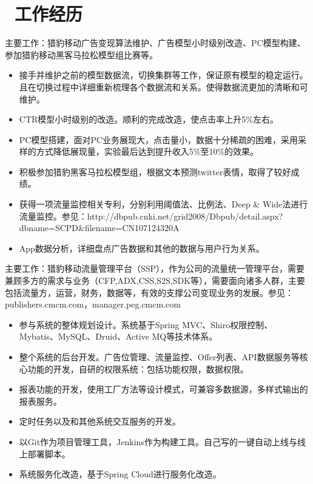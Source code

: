 \documentclass{resume}
\begin{document}



\section{\faUsers\ 工作经历}
\role{CTR、CVR预估}{广告算法}
\begin{onehalfspacing}
主要工作：猎豹移动广告变现算法维护、广告模型小时级别改造、PC模型构建、参加猎豹移动黑客马拉松模型组比赛等。
\begin{itemize}
  \item 接手并维护之前的模型数据流，切换集群等工作，保证原有模型的稳定运行。且在切换过程中详细重新梳理各个数据流和关系。使得数据流更加的清晰和可维护。 
  \item CTR模型小时级别的改造。顺利的完成改造，使点击率上升5\%左右。
  \item PC模型搭建，面对PC业务展现大，点击量小，数据十分稀疏的困难，采用采样的方式降低展现量，实验最后达到提升收入5\%至10\%的效果。
  \item 积极参加猎豹黑客马拉松模型组，根据文本预测twitter表情，取得了较好成绩。
  \item 获得一项流量监控相关专利，分别利用阈值法、比例法、Deep \& Wide法进行流量监控。参见：http://dbpub.cnki.net/grid2008/Dbpub/detail.aspx?dbname=SCPD\&filename=CN107124320A
  \item App数据分析，详细盘点广告数据和其他的数据与用户行为关系。
\end{itemize}
\end{onehalfspacing}

\begin{onehalfspacing}
主要工作：猎豹移动流量管理平台（SSP），作为公司的流量统一管理平台，需要兼顾多方的需求与业务（CFP,ADX,CSS,S2S,SDK等），需要面向诸多人群，主要包括流量方，运营，财务，数据等，有效的支撑公司变现业务的发展。参见：publishers.cmcm.com，manager.peg.cmcm.com
\begin{itemize}
  \item 参与系统的整体规划设计。系统基于Spring MVC、Shiro权限控制、Mybatis、MySQL、Druid、Active MQ等技术体系。
  \item 整个系统的后台开发。广告位管理、流量监控、Offer列表、API数据服务等核心功能的开发，自研的权限系统：包括功能权限，数据权限。
  \item 报表功能的开发，使用工厂方法等设计模式，可兼容多数据源，多样式输出的报表服务。
  \item 定时任务以及和其他系统交互服务的开发。
  \item 以Git作为项目管理工具，Jenkins作为构建工具。自己写的一键自动上线与线上部署脚本。
  \item 系统服务化改造，基于Spring Cloud进行服务化改造。 
\end{itemize}
\end{onehalfspacing}
\end{document}
